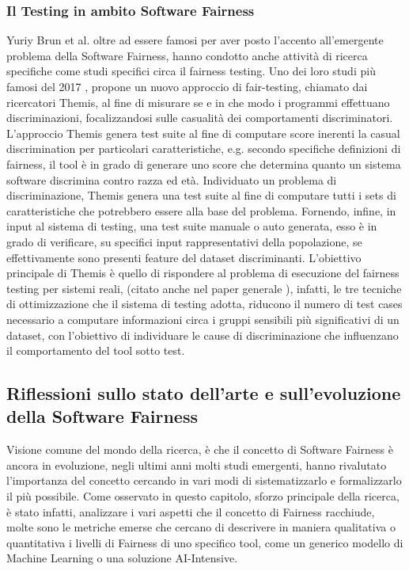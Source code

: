 \subsubsection{Il Testing in ambito Software Fairness}
Yuriy Brun et al. oltre ad essere famosi per aver posto l'accento all'emergente problema della Software Fairness, hanno condotto anche attività di ricerca specifiche come studi specifici circa il fairness testing. Uno dei loro studi più famosi del 2017 \cite{galhotra2017fairness}, propone un nuovo approccio di fair-testing, chiamato dai ricercatori Themis, al fine di misurare se e in che modo i programmi effettuano discriminazioni, focalizzandosi sulle casualità dei comportamenti discriminatori. L'approccio Themis genera test suite al fine di computare score inerenti la casual discrimination per particolari caratteristiche, e.g. secondo specifiche definizioni di fairness, il tool è in grado di generare uno score che determina quanto un sistema software discrimina contro razza ed età. Individuato un problema di discriminazione, Themis genera una test suite al fine di computare tutti i sets di caratteristiche che potrebbero essere alla base del problema. Fornendo, infine, in input al sistema di testing, una test suite manuale o auto generata, esso è in grado di verificare, su specifici input rappresentativi della popolazione, se effettivamente sono presenti feature del dataset discriminanti. L'obiettivo principale di Themis è quello di rispondere al problema di esecuzione del fairness testing per sistemi reali, (citato anche nel paper generale \cite{brun2018software}), infatti, le tre tecniche di ottimizzazione che il sistema di testing adotta, riducono il numero di test cases necessario a computare informazioni circa i gruppi sensibili più significativi di un dataset, con l'obiettivo di individuare le cause di discriminazione che influenzano il comportamento del tool sotto test.

\subsection{Riflessioni sullo stato dell'arte e sull'evoluzione della Software Fairness}

Visione comune del mondo della ricerca, è che il concetto di Software Fairness è ancora in evoluzione, negli ultimi anni molti studi emergenti, hanno rivalutato l'importanza del concetto cercando in vari modi di sistematizzarlo e formalizzarlo il più possibile. Come osservato in questo capitolo, sforzo principale della ricerca, è stato infatti, analizzare i vari aspetti che il concetto di Fairness racchiude, molte sono le metriche emerse che cercano di descrivere in maniera qualitativa o quantitativa i livelli di Fairness di uno specifico tool, come un generico modello di Machine Learning o una soluzione AI-Intensive.\\

